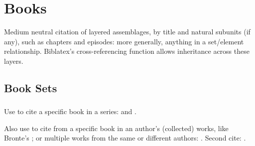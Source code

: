 \section{Books}
Medium neutral citation of layered assemblages, 
by title and natural subunits (if any), such as chapters and episodes: more generally, anything in a set/element relationship. 
Biblatex's cross-referencing function allows inheritance across these layers.\subsection{Book Sets}
\subsubsection{}
Use  to cite a specific book in a series: {\color{blue}} and {\color{blue}}.


Also use  to cite from a specific book in an author's (collected) works, like Bronte's {\color{blue}}; or multiple works from the same or different authors: {\color{blue}}. Second cite: {\color{blue}}.


